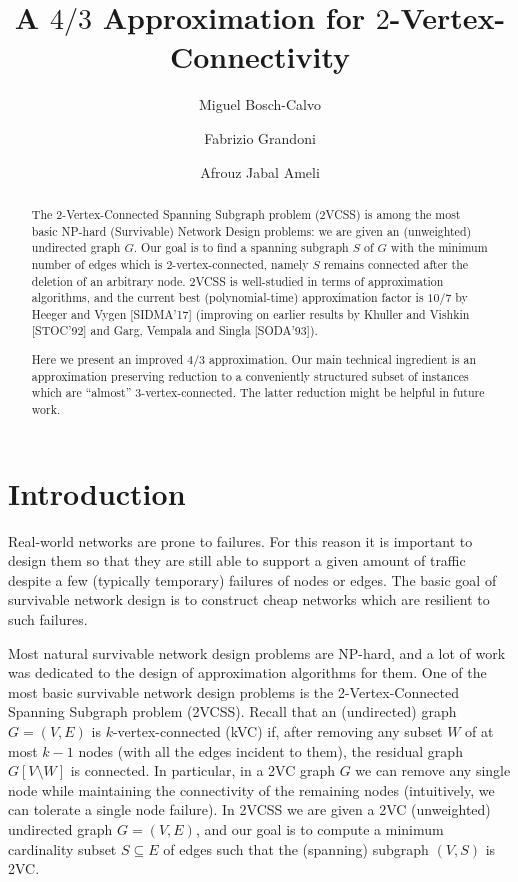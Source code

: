 \documentclass{article}
\author{Miguel Bosch-Calvo \and Fabrizio Grandoni \and Afrouz Jabal Ameli}\date{}
\title{A \texorpdfstring{$4/3$}{4/3} Approximation for \texorpdfstring{$2$}{2}-Vertex-Connectivity}
\begin{document}
\maketitle

\begin{abstract}
The 2-Vertex-Connected Spanning Subgraph problem (2VCSS) is among the most basic NP-hard (Survivable) Network Design problems: we are given an (unweighted) undirected graph $G$. Our goal is to find a spanning subgraph $S$ of $G$ with the minimum number of edges which is $2$-vertex-connected, namely $S$ remains connected after the deletion of an arbitrary node. 2VCSS is well-studied in terms of approximation algorithms, and the current best (polynomial-time) approximation factor is $10/7$ by Heeger and Vygen [SIDMA'17] (improving on earlier results by Khuller and Vishkin [STOC'92] and Garg, Vempala and Singla [SODA'93]).

Here we present an improved $4/3$ approximation. Our main technical ingredient is an approximation preserving reduction to a conveniently structured subset of instances which are ``almost'' 3-vertex-connected. The latter reduction might be helpful in future work. 
\end{abstract}

\section{Introduction}

Real-world networks are prone to failures. For this reason it is important to design them so that they are still able to support a given amount of traffic despite a few (typically temporary) failures of nodes or edges. The basic goal of survivable network design is to construct cheap networks which are resilient to such failures. 

Most natural survivable network design problems are NP-hard, and a lot of work was dedicated to the design of approximation algorithms for them. One of the most basic survivable network design problems is the 2-Vertex-Connected Spanning Subgraph problem (2VCSS). Recall that an (undirected) graph $G=(V,E)$ is $k$-vertex-connected (kVC) if, after removing any subset $W$ of at most $k-1$ nodes (with all the edges incident to them), the residual graph $G[V\setminus W]$ is connected. In particular, in a 2VC graph $G$ we can remove any single node while maintaining the connectivity of the remaining nodes (intuitively, we can tolerate a single node failure). In 2VCSS we are given a 2VC (unweighted) undirected graph $G=(V,E)$, and our goal is to compute a minimum cardinality subset $S\subseteq E$ of edges such that the (spanning) subgraph $(V,S)$ is 2VC. 
\end{document}
